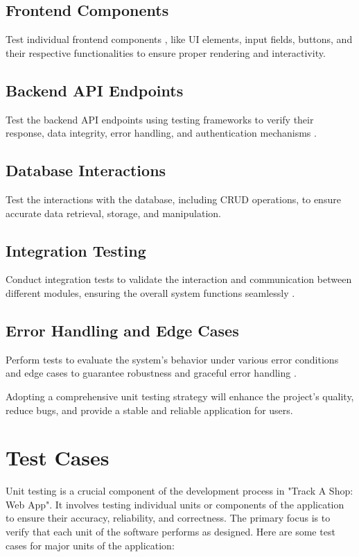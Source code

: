 \subsection{Frontend Components} Test individual frontend components \citep{reactjs-docs}, like UI elements, input fields, buttons, and their respective functionalities to ensure proper rendering and interactivity.
	
\subsection{Backend API Endpoints} Test the backend API endpoints using testing frameworks to verify their response, data integrity, error handling, and authentication mechanisms \citep{postman-docs}.
	
\subsection{Database Interactions} Test the interactions with the database, including CRUD operations, to ensure accurate data retrieval, storage, and manipulation.
	
\subsection{Integration Testing} Conduct integration tests to validate the interaction and communication between different modules, ensuring the overall system functions seamlessly \citep{rest-arch}.
	
\subsection{Error Handling and Edge Cases} Perform tests to evaluate the system's behavior under various error conditions and edge cases to guarantee robustness and graceful error handling \citep{sentry-docs}.


Adopting a comprehensive unit testing strategy will enhance the project's quality, reduce bugs, and provide a stable and reliable application for users.

\section{Test Cases}
Unit testing is a crucial component of the development process in "Track A Shop: Web App". It involves testing individual units or components of the application to ensure their accuracy, reliability, and correctness. The primary focus is to verify that each unit of the software performs as designed. Here are some test cases for major units of the application:


